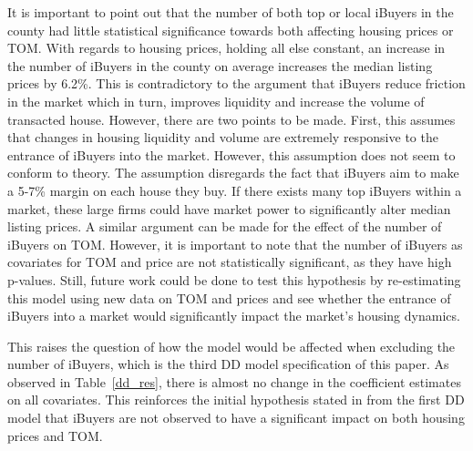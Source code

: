 It is important to point out that the number of both top or local iBuyers in the county had little statistical significance towards both affecting housing prices or TOM. With regards to housing prices, holding all else constant, an increase in the number of iBuyers in the county on average increases the median listing prices by 6.2\%. This is contradictory to the argument that iBuyers reduce friction in the market which in turn, improves liquidity and increase the volume of transacted house. However, there are two points to be made. First, this assumes that changes in housing liquidity and volume are extremely responsive to the entrance of iBuyers into the market. However, this assumption does not seem to conform to theory. The assumption disregards the fact that iBuyers aim to make a 5-7\% margin on each house they buy. If there exists many top iBuyers within a market, these large firms could have market power to significantly alter median listing prices. A similar argument can be made for the effect of the number of iBuyers on TOM. However, it is important to note that the number of iBuyers as covariates for TOM and price are not statistically significant, as they have high p-values. Still, future work could be done to test this hypothesis by re-estimating this model using new data on TOM and prices and see whether the entrance of iBuyers into a market would significantly impact the market's housing dynamics.

This raises the question of how the model would be affected when excluding the number of iBuyers, which is the third DD model specification of this paper. As observed in Table~\ref{dd_res}, there is almost no change in the coefficient estimates on all covariates. This reinforces the initial hypothesis stated in from the first DD model that iBuyers are not observed to have a significant impact on both housing prices and TOM.  
